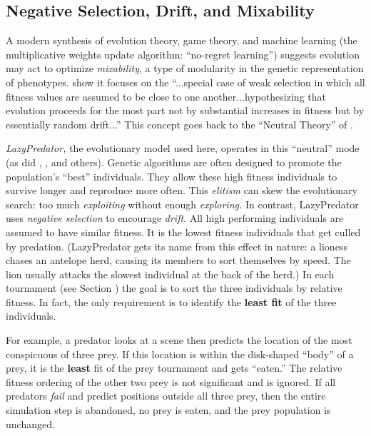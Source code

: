 \documentclass[letterpaper]{article}
\newcommand{\jargon}[1]{\textit{#1}}
\newcommand{\lazypredator}[0]{LazyPredator}
\begin{document}
\subsection{Negative Selection, Drift, and Mixability}

A modern synthesis \citep{livnat_sex_2016} of evolution theory, game theory, and machine learning (the multiplicative weights update algorithm: “no-regret learning”) suggests evolution may act to optimize \jargon{mixability}, a type of modularity in the genetic representation of phenotypes. \citet{chastain_multiplicative_2013} show it focuses on the “...special case of weak selection in which all fitness values are assumed to be close to one another...hypothesizing that evolution proceeds for the most part not by substantial increases in fitness but by essentially random drift...” This concept goes back to the “Neutral Theory” of \citet{kimura_evolutionary_1968}.
\par
\jargon{\lazypredator{},} the evolutionary model used here, operates in this “neutral” mode (as did \citet{reynolds_iec_2011}, \citet{harrington_coevolution_2014}, and others). Genetic algorithms are often designed to promote the population's “best” individuals. They allow these high fitness individuals to survive longer and reproduce more often. This \jargon{elitism} can skew the evolutionary search: too much \jargon{exploiting} without enough \jargon{exploring.}  In contrast, \lazypredator{} uses \textit{negative selection} to encourage \jargon{drift}. All high performing individuals are assumed to have similar fitness. It is the lowest fitness individuals that get culled by predation. (LazyPredator gets its name from this effect in nature: a lioness chases an antelope herd, causing its members to sort themselves by speed. The lion usually attacks the slowest individual at the back of the herd.) In each tournament (see Section ) the goal is to sort the three individuals by relative fitness. In fact, the only requirement is to identify the \textbf{least fit} of the three individuals.
\par 
For example, a predator looks at a scene then predicts the location of the most conspicuous of three prey. If this location is within the disk-shaped “body” of a prey, it is the \textbf{least} fit of the prey tournament and gets “eaten.” The relative fitness ordering of the other two prey is not significant and is ignored. If all predators \jargon{fail} and predict positions outside all three prey, then the entire simulation step is abandoned, no prey is eaten, and the prey population is unchanged.
\end{document}
